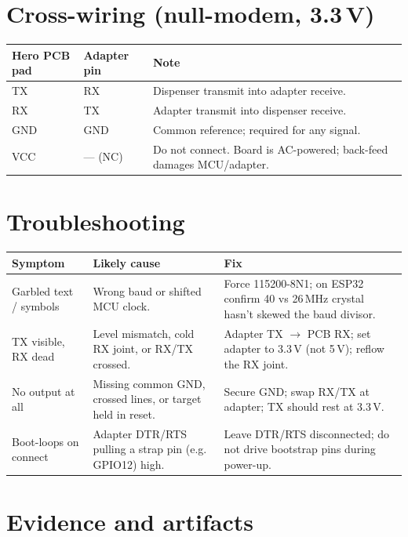 \documentclass[10pt]{article}
\begin{document}
\section{Cross-wiring (null-modem, 3.3\,V)}

\begin{center}\scriptsize
\begin{tabular}{|L{1.3in}|L{1.6in}|L{3.1in}|}
\hline
\textbf{Hero PCB pad} & \textbf{Adapter pin} & \textbf{Note} \\
\hline
TX & RX & Dispenser transmit into adapter receive. \\
\hline
RX & TX & Adapter transmit into dispenser receive. \\
\hline
GND & GND & Common reference; required for any signal. \\
\hline
VCC & --- (NC) & Do not connect. Board is AC-powered; back-feed damages MCU/adapter. \\
\hline
\end{tabular}
\end{center}

\section{Troubleshooting}

\begin{center}\scriptsize
\begin{tabular}{|L{1.5in}|L{2.0in}|L{2.4in}|}
\hline
\textbf{Symptom} & \textbf{Likely cause} & \textbf{Fix} \\
\hline
Garbled text / symbols & Wrong baud or shifted MCU clock. & Force 115200-8N1; on ESP32 confirm 40 vs 26\,MHz crystal hasn't skewed the baud divisor. \\
\hline
TX visible, RX dead & Level mismatch, cold RX joint, or RX/TX crossed. & Adapter TX $\rightarrow$ PCB RX; set adapter to 3.3\,V (not 5\,V); reflow the RX joint. \\
\hline
No output at all & Missing common GND, crossed lines, or target held in reset. & Secure GND; swap RX/TX at adapter; TX should rest at 3.3\,V. \\
\hline
Boot-loops on connect & Adapter DTR/RTS pulling a strap pin (e.g. GPIO12) high. & Leave DTR/RTS disconnected; do not drive bootstrap pins during power-up. \\
\hline
\end{tabular}
\end{center}

\section{Evidence and artifacts}
\end{document}
